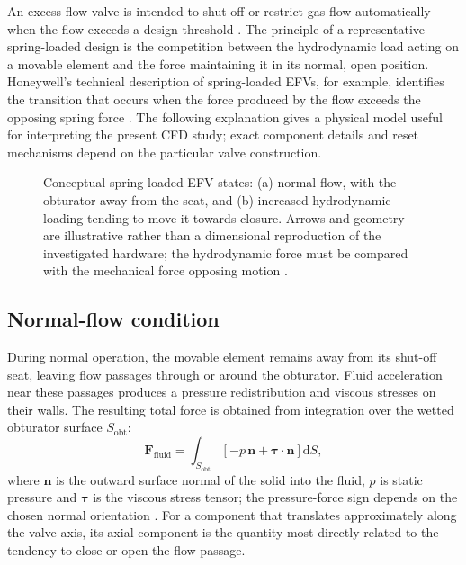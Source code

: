An excess-flow valve is intended to shut off or restrict gas flow automatically when the flow exceeds a design threshold \cite{iso19880_3}. The principle of a representative spring-loaded design is the competition between the hydrodynamic load acting on a movable element and the force maintaining it in its normal, open position. Honeywell's technical description of spring-loaded EFVs, for example, identifies the transition that occurs when the force produced by the flow exceeds the opposing spring force \cite{honeywell_efv}. The following explanation gives a physical model useful for interpreting the present CFD study; exact component details and reset mechanisms depend on the particular valve construction.


\begin{figure}[htbp]
\centering
\resizebox{\textwidth}{!}{}
\caption{Conceptual spring-loaded EFV states: (a) normal flow, with the obturator away from the seat, and (b) increased hydrodynamic loading tending to move it towards closure. Arrows and geometry are illustrative rather than a dimensional reproduction of the investigated hardware; the hydrodynamic force must be compared with the mechanical force opposing motion \cite{iso19880_3,white2016}.}
\label{fig:efv_open_closing}
\end{figure}

\subsection{Normal-flow condition}

During normal operation, the movable element remains away from its shut-off seat, leaving flow passages through or around the obturator. Fluid acceleration near these passages produces a pressure redistribution and viscous stresses on their walls. The resulting total force is obtained from integration over the wetted obturator surface $S_{\mathrm{obt}}$:
\begin{equation}
\mathbf{F}_{\mathrm{fluid}}=
\int_{S_{\mathrm{obt}}}\left[-p\,\mathbf{n}+\boldsymbol{\tau}\cdot\mathbf{n}\right]\mathrm{d}S,
\label{eq:efv_surface_force}
\end{equation}
where $\mathbf{n}$ is the outward surface normal of the solid into the fluid, $p$ is static pressure and $\boldsymbol{\tau}$ is the viscous stress tensor; the pressure-force sign depends on the chosen normal orientation \cite{white2016,moukalled2016}. For a component that translates approximately along the valve axis, its axial component is the quantity most directly related to the tendency to close or open the flow passage.

